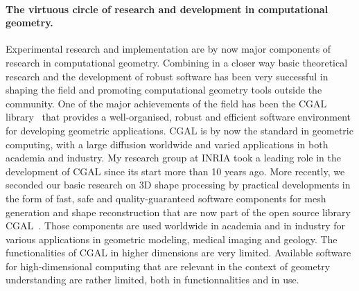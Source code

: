 

\paragraph{The  virtuous circle  of research and development in computational geometry.}
Experimental research and implementation are by now major components of research in computational geometry.  
Combining in a closer way basic theoretical research and the development of robust software
has been very successful in shaping the field and promoting computational geometry tools outside the community.
One of the major achievements of the field has been the CGAL library~\cite{cgal} that provides a well-organised, robust and efficient software environment for developing geometric applications. CGAL is by now the standard in geometric computing, with a large diffusion worldwide and varied applications in both academia and industry.  My research group at INRIA took a leading role in the development of CGAL since its start more than 10 years ago. More recently, we seconded our basic research on 3D shape processing by practical developments in the form of fast, safe and quality-guaranteed software components for mesh generation and shape reconstruction that are now part of the open source library CGAL~\cite{cgal:rty-m3-11}. Those components are used worldwide in academia and in industry for various applications in geometric modeling, medical imaging and geology. The functionalities of CGAL in higher dimensions are very limited. Available software for high-dimensional computing that are relevant in the context of geometry understanding are rather limited, both in functionnalities and in use.


